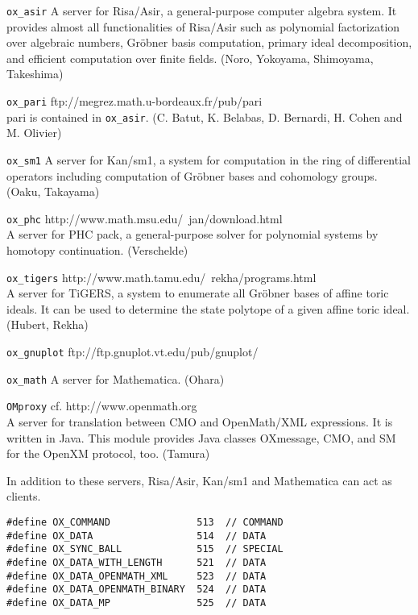 \documentclass{slides}
\begin{document}
\begin{description}
\item{\tt ox\_asir}
A server for Risa/Asir, a general-purpose computer algebra
system. It provides almost
all functionalities of Risa/Asir such as polynomial factorization over algebraic numbers,
Gr\"obner basis computation, primary ideal decomposition,
and efficient computation over finite fields.
(Noro, Yokoyama, Shimoyama, Takeshima)
\item{\tt ox\_pari}  {\footnotesize ftp://megrez.math.u-bordeaux.fr/pub/pari}\\
pari is contained in {\tt ox\_asir}.
(C. Batut, K. Belabas, D. Bernardi, H. Cohen and M. Olivier)
\item{\tt ox\_sm1}  
A server for Kan/sm1, a system for computation in 
the ring of differential operators including computation of Gr\"obner bases
and cohomology groups.
(Oaku, Takayama)
\item {\tt ox\_phc}  {\footnotesize http://www.math.msu.edu/~jan/download.html} \\
A server for PHC pack, a general-purpose solver for
polynomial systems by homotopy continuation. 
(Verschelde)
\item {\tt ox\_tigers} {\footnotesize         http://www.math.tamu.edu/~rekha/programs.html } \\
A server for TiGERS, a system to enumerate
all Gr\"obner bases of affine toric ideals.
It can be used to determine the state polytope
of a given affine toric ideal.
(Hubert, Rekha)
\item {\tt ox\_gnuplot}  {\footnotesize ftp://ftp.gnuplot.vt.edu/pub/gnuplot/}\\
\item {\tt ox\_math}
A server for Mathematica.
(Ohara)
\item {\tt OMproxy}  {\footnotesize cf. http://www.openmath.org} \\
A server for translation between CMO and OpenMath/XML expressions.
It is written in Java.
This module provides Java classes OXmessage, CMO, and SM
for the OpenXM protocol, too.
(Tamura)
\end{description}
In addition to these servers, Risa/Asir, Kan/sm1 and Mathematica
can act as clients. 
\newpage
{}
{\footnotesize
\begin{verbatim}
#define	OX_COMMAND               513  // COMMAND
#define	OX_DATA	                 514  // DATA
#define OX_SYNC_BALL             515  // SPECIAL
#define OX_DATA_WITH_LENGTH      521  // DATA
#define OX_DATA_OPENMATH_XML     523  // DATA
#define OX_DATA_OPENMATH_BINARY  524  // DATA
#define OX_DATA_MP               525  // DATA
\end{verbatim} }
\newpage
\end{document}
